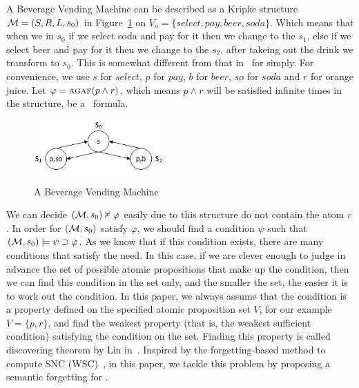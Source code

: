 \documentclass{article}
\begin{document}
\begin{example}\label{exmp:1}
A Beverage Vending Machine %
 can be described as a Kripke structure ${\cal M}=(S, R, L, s_0)$ in Figure~\ref{BVM} on $V_a=\{select, pay, beer, soda\}$.
Which means that when we in $s_0$ if we select soda and pay for it then we change to the $s_1$, else if we select beer and pay for it then we change to the $s_2$, after takeing out the drink we transform to $s_0$. This is somewhat different from that in~\cite{Baier:PMC:2008} for simply.
For convenience, we use $s$ for $select$, $p$ for $pay$, $b$ for $beer$, $so$ for $soda$ and $r$ for orange juice.
Let $\varphi=\textsc{a}\textsc{g} \textsc{a} \textsc{f}(p\wedge r)$, which means $p\wedge r$ will be satisfied infinite times in the structure, be a \CTL\ formula.
\begin{figure}
  \centering
  \includegraphics[width=5cm]{BVM.png}\\
  \caption{A Beverage Vending Machine}\label{BVM}
\end{figure}
\end{example}

We can decide $({\cal M}, s_0)\nvDash \varphi$ easily due to this structure do not contain the atom $r$.
In order for $({\cal M}, s_0)$ satisfy $\varphi$, we should find a condition $\psi$ such that $({\cal M}, s_0) \models \psi \supset \varphi$.
 As we know that if this condition exists, there are many conditions that satisfy the need.
In this case, if we are clever enough to judge in advance the set of possible atomic propositions that make up the condition, then we can find this condition in the set only, and the smaller the set, the easier it is to work out the condition.
In this paper, we always assume that the condition is a property defined on the specified atomic proposition set $V$, for our example $V=\{p,r\}$, and find the weakest property (that is, the weakest sufficient condition) satisfying the condition on the set. Finding this property is called discovering theorem by Lin in~\cite{DBLP:journals/aim/Lin18}.
Inspired by the forgetting-based method to compute SNC (WSC)~\cite{DBLP:journals/ai/Lin01}, in this paper, we tackle this problem by proposing a semantic forgetting for \CTL.
\end{document}
